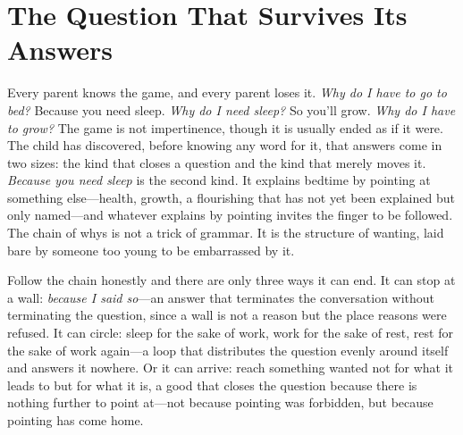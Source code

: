 \section{The Question That Survives Its Answers}

Every parent knows the game, and every parent loses it. \emph{Why do I have to go to bed?} Because you need sleep. \emph{Why do I need sleep?} So you'll grow. \emph{Why do I have to grow?} The game is not impertinence, though it is usually ended as if it were. The child has discovered, before knowing any word for it, that answers come in two sizes: the kind that closes a question and the kind that merely moves it. \emph{Because you need sleep} is the second kind. It explains bedtime by pointing at something else---health, growth, a flourishing that has not yet been explained but only named---and whatever explains by pointing invites the finger to be followed. The chain of whys is not a trick of grammar. It is the structure of wanting, laid bare by someone too young to be embarrassed by it.

Follow the chain honestly and there are only three ways it can end. It can stop at a wall: \emph{because I said so}---an answer that terminates the conversation without terminating the question, since a wall is not a reason but the place reasons were refused. It can circle: sleep for the sake of work, work for the sake of rest, rest for the sake of work again---a loop that distributes the question evenly around itself and answers it nowhere. Or it can arrive: reach something wanted not for what it leads to but for what it is, a good that closes the question because there is nothing further to point at---not because pointing was forbidden, but because pointing has come home.

